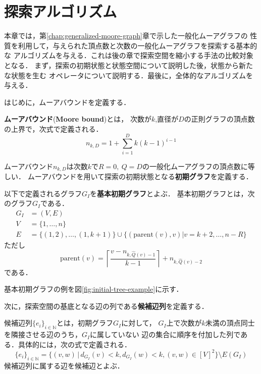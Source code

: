 
\chapter{探索アルゴリズム}
\label{chap:basic-algorithm}
本章では，第\ref{chap:generalized-moore-graph}章で示した一般化ムーアグラフの
性質を利用して，与えられた頂点数と次数の一般化ムーアグラフを探索する基本的な
アルゴリズムを与える．これは後の章で探索空間を縮小する手法の比較対象となる．
まず，探索の初期状態と状態空間について説明した後，状態から新たな状態を生む
オペレータについて説明する．最後に，全体的なアルゴリズムを与える．

はじめに，ムーアバウンドを定義する．
\begin{definition}\rm
  \textbf{ムーアバウンド}(\textbf{Moore bound})とは，
  次数が$k$,直径が$D$の正則グラフの頂点数の上界で，次式で定義される．
  \begin{equation}
    n_{k,D} = 1 + \sum_{i=1}^Dk(k-1)^{i-1}
  \end{equation}
\end{definition}

ムーアバウンド$n_{k,D}$は次数$k$で$R=0,\ Q=D$の一般化ムーアグラフの頂点数に等しい．
ムーアバウンドを用いて探索の初期状態となる\textbf{初期グラフ}を定義する．

\begin{definition}\rm
  \label{def:basic-initial-graph}
  以下で定義されるグラフ$G_I$を\textbf{基本初期グラフ}とよぶ．
  基本初期グラフとは，次のグラフ$G_I$である．
  \begin{equation}
    \begin{aligned}
      \label{eq:basic-initial-graph}
      G_I&=(V,E) \\
      V&=\{1,\ldots,n\} \\
      E&=\{(1,2),\ldots,(1,k+1)\}\cup
      \{(\text{parent}(v),v)|v=k+2,\ldots,n-R\}
    \end{aligned}
  \end{equation}
  ただし
  \[\text{parent}(v)=
  \left\lceil\frac{v-n_{k,\hat{Q}(v)-1}}{k-1}\right\rceil+n_{k,\hat{Q}(v)-2}\]
  である．
\end{definition}

基本初期グラフの例を図\ref{fig:initial-tree-example}に示す．

次に，探索空間の基底となる辺の列である\textbf{候補辺列}を定義する．

\begin{definition}\rm
  \label{def:candidate-edges}
  候補辺列$\{e_i\}_{i\in\mathbb{N}}$とは，初期グラフ$G_I$に対して，
  $G_I$上で次数が$k$未満の頂点同士を隣接させる辺のうち，$G_I$に属していない
  辺の集合に順序を付加した列である．具体的には，次の式で定義される．
  \begin{equation}
    \{e_i\}_{i\in\mathbb{N}} =
    \{(v,w)\,|\,d_{G_I}(v)<k,d_{G_I}(w)<k,(v,w)\in[V]^2\}\setminus E(G_I)
  \end{equation}
  候補辺列に属する辺を候補辺とよぶ．
\end{definition}

